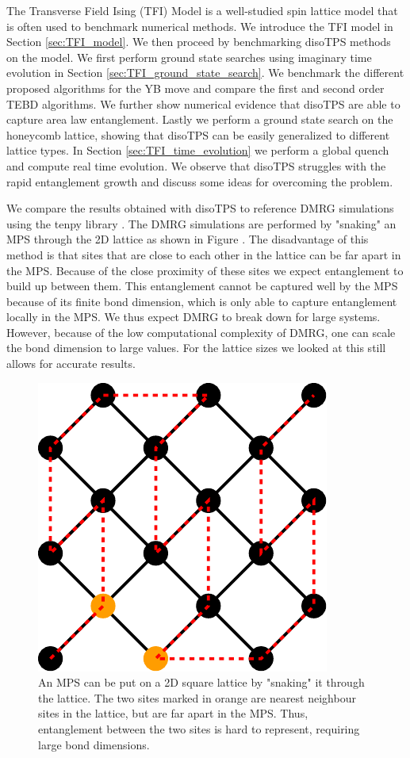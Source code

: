 The Transverse Field Ising (TFI) Model is a well-studied spin lattice model that is often used to benchmark numerical methods. We introduce the TFI model in Section \ref{sec:TFI_model}. We then proceed by benchmarking disoTPS methods on the model. We first perform ground state searches using imaginary time evolution in Section \ref{sec:TFI_ground_state_search}. We benchmark the different proposed algorithms for the YB move and compare the first and second order TEBD algorithms. We further show numerical evidence that disoTPS are able to capture area law entanglement. Lastly we perform a ground state search on the honeycomb lattice, showing that disoTPS can be easily generalized to different lattice types. In Section \ref{sec:TFI_time_evolution} we perform a global quench and compute real time evolution. We observe that disoTPS struggles with the rapid entanglement growth and discuss some ideas for overcoming the problem. \par
We compare the results obtained with disoTPS to reference DMRG simulations using the tenpy library \cite{cite:tenpy}. The DMRG simulations are performed by "snaking" an MPS through the 2D lattice as shown in Figure . The disadvantage of this method is that sites that are close to each other in the lattice can be far apart in the MPS. Because of the close proximity of these sites we expect entanglement to build up between them. This entanglement cannot be captured well by the MPS because of its finite bond dimension, which is only able to capture entanglement locally in the MPS. We thus expect DMRG to break down for large systems. However, because of the low computational complexity of DMRG, one can scale the bond dimension to large values. For the lattice sizes we looked at this still allows for accurate results.
\begin{figure}
	\centering
	\includegraphics[scale=0.6]{figures/tikz/TFI/dmrg_snaking/dmrg_snaking.pdf}
	\caption{An MPS can be put on a 2D square lattice by "snaking" it through the lattice. The two sites marked in orange are nearest neighbour sites in the lattice, but are far apart in the MPS. Thus, entanglement between the two sites is hard to represent, requiring large bond dimensions.}
	\label{fig:tenpy_snaking}
\end{figure}

